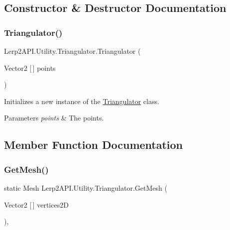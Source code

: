 \subsection{Constructor \& Destructor Documentation}
\mbox{\label{class_lerp2_a_p_i_1_1_utility_1_1_triangulator_ac9456e6e7b64cb7755e9d543508bb1b0}} 
\subsubsection{\texorpdfstring{Triangulator()}{Triangulator()}}
{\footnotesize\ttfamily Lerp2\+A\+P\+I.\+Utility.\+Triangulator.\+Triangulator (\begin{DoxyParamCaption}\item[{Vector2 \mbox{[}$\,$\mbox{]}}]{points }\end{DoxyParamCaption})\hspace{0.3cm}{\ttfamily [inline]}}



Initializes a new instance of the \hyperlink{class_lerp2_a_p_i_1_1_utility_1_1_triangulator}{Triangulator} class. 


\begin{DoxyParams}{Parameters}
{\em points} & The points.\\
\hline
\end{DoxyParams}


\subsection{Member Function Documentation}
\mbox{\label{class_lerp2_a_p_i_1_1_utility_1_1_triangulator_a26d50740cfb15d2532c7f44878b72218}} 
\subsubsection{\texorpdfstring{Get\+Mesh()}{GetMesh()}}
{\footnotesize\ttfamily static Mesh Lerp2\+A\+P\+I.\+Utility.\+Triangulator.\+Get\+Mesh (\begin{DoxyParamCaption}\item[{Vector2 \mbox{[}$\,$\mbox{]}}]{vertices2D }\end{DoxyParamCaption})\hspace{0.3cm}{\ttfamily [inline]}, {\ttfamily [static]}}



